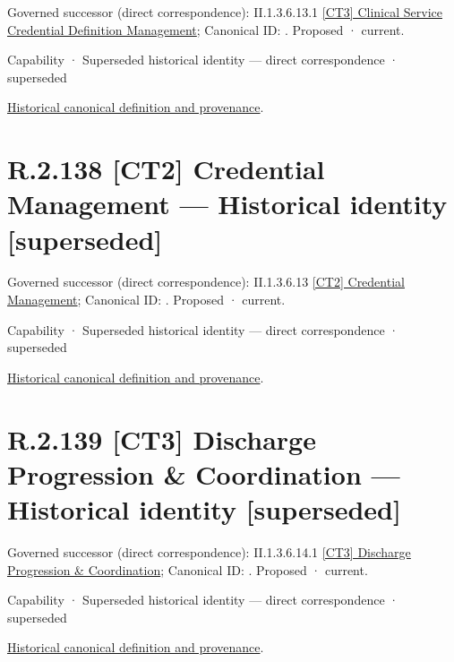 {\small Governed successor (direct correspondence): II.1.3.6.13.1 \hyperref[element:2e5c97f51e7e48d1b865ac416dd8099d]{[CT3] Clinical Service Credential Definition Management}; Canonical ID: \texttt{}. Proposed · current.}\par
\label{element:0115ed50867d468a95c0fafa1c5d79e2}
{\small Capability · Superseded historical identity — direct correspondence · superseded}\par
\href{../../../../continuum/strategy/capability/0115ed50867d468a95c0fafa1c5d79e2.md}{Historical canonical definition and provenance}.\par
\section*{R.2.138 [CT2] Credential Management — Historical identity [superseded]}
\label{navigation:R.2.138}

{\small Governed successor (direct correspondence): II.1.3.6.13 \hyperref[element:21eed4fc8c924496b16c6ddaa32f3d01]{[CT2] Credential Management}; Canonical ID: \texttt{}. Proposed · current.}\par
\label{element:bab3d0ab6eb748978b962ea20fb31640}
{\small Capability · Superseded historical identity — direct correspondence · superseded}\par
\href{../../../../continuum/strategy/capability/bab3d0ab6eb748978b962ea20fb31640.md}{Historical canonical definition and provenance}.\par
\section*{R.2.139 [CT3] Discharge Progression \& Coordination — Historical identity [superseded]}
\label{navigation:R.2.139}

{\small Governed successor (direct correspondence): II.1.3.6.14.1 \hyperref[element:d6048993146b45639bab27860f94f34f]{[CT3] Discharge Progression \& Coordination}; Canonical ID: \texttt{}. Proposed · current.}\par
\label{element:68344272ca6049648a3ddae20c150f37}
{\small Capability · Superseded historical identity — direct correspondence · superseded}\par
\href{../../../../continuum/strategy/capability/68344272ca6049648a3ddae20c150f37.md}{Historical canonical definition and provenance}.\par
